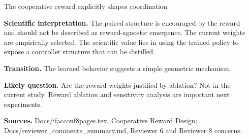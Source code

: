 \documentclass[aspectratio=169,11pt]{beamer}
\begin{document}
\begin{frame}[shrink=8]{The cooperative reward explicitly shapes coordination}
{    \textbf{Scientific interpretation.} The paired structure is encouraged by the reward and should not be described as reward-agnostic emergence. The current weights are empirically selected. The scientific value lies in using the trained policy to expose a controller structure that can be distilled.

    \textbf{Transition.} The learned behavior suggests a simple geometric mechanism.

    \textbf{Likely question.} Are the reward weights justified by ablation? Not in the current study. Reward ablation and sensitivity analysis are important next experiments.

    \textbf{Sources.} Docs/ifacconf8pages.tex, Cooperative Reward Design; Docs/reviewer\_comments\_summary.md, Reviewer 6 and Reviewer 8 concerns.
  }
\end{frame}
\end{document}
